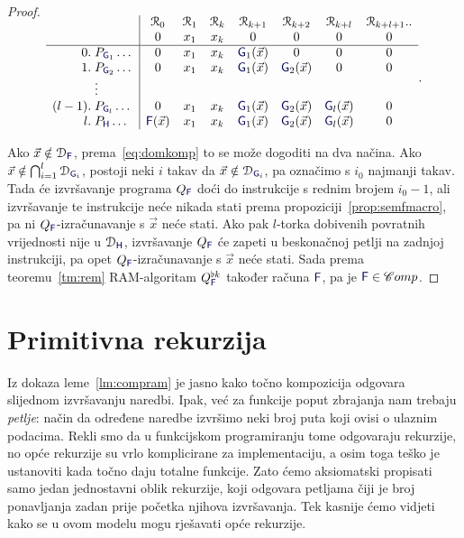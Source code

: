 \begin{proof}
\begin{equation}
\begin{array}{r@{\;}l|ccccccc}
\SwapAboveDisplaySkip
      &               &\reg0       &\reg1&\reg{k}&\reg{k+1}     &\reg{k+2}     &\reg{k+l}     &\reg{k+l+1}..\\
      &               & 0          &x_1  &x_k    &0             &0             &0             &0            \\\hline
0.    &P_{\f G_1}\dots& 0          &x_1  &x_k    &\f G_1(\vec x)&0             &0             &0            \\
1.    &P_{\f G_2}\dots& 0          &x_1  &x_k    &\f G_1(\vec x)&\f G_2(\vec x)&0             &0            \\
      &\vdots                                                                                               \\
(l-1).&P_{\f G_l}\dots& 0          &x_1  &x_k    &\f G_1(\vec x)&\f G_2(\vec x)&\f G_l(\vec x)&0            \\
l.    &P_{\f H}\dots  &\f F(\vec x)&x_1  &x_k    &\f G_1(\vec x)&\f G_2(\vec x)&\f G_l(\vec x)&0
    \end{array}\text.
\end{equation}
\smallskip

Ako $\vec x\notin\dom{\f F}$, prema~\eqref{eq:domkomp} to se može dogoditi na dva načina. Ako $\vec x\notin\bigcap_{i=1}^l\dom{\f G_i}$, postoji neki $i$ takav da $\vec x\notin\dom{\f G_i}$, pa označimo s $i_0$ najmanji takav\!. Tada će izvršavanje programa $Q_{\f F}$ doći do instrukcije s rednim brojem $i_0-1$, ali izvršavanje te instrukcije neće nikada stati prema propoziciji~\ref{prop:semfmacro}, pa ni $Q_{\f F}$-izračunavanje s $\vec x$ neće stati. Ako pak $l$-torka dobivenih povratnih vrijednosti nije u $\dom{\f H}$, izvršavanje $Q_{\f F}$ će zapeti u beskonačnoj petlji na zadnjoj instrukciji, pa opet $Q_{\f F}$-izračunavanje s $\vec x$ neće stati.
Sada prema teoremu~\ref{tm:rem} RAM-algoritam $Q_{\f F}^{\flat k}$ također računa $\f F$, pa je $\f F\in\mathscr Comp$.
\end{proof}

\section{Primitivna rekurzija}

Iz dokaza leme~\ref{lm:compram} je jasno kako točno kompozicija odgovara slijednom iz\-vrša\-va\-nju naredbi. Ipak, već za funkcije poput zbrajanja nam trebaju \emph{petlje}: način da određene naredbe izvršimo neki broj puta koji ovisi o ulaznim podacima. Rekli smo da u funkcijskom programiranju tome odgovaraju rekurzije, no opće rekurzije su vrlo komplicirane za implementaciju, a osim toga teško je ustanoviti kada točno daju totalne funkcije. Zato ćemo aksiomatski propisati samo jedan jednostavni oblik rekurzije, koji odgovara petljama čiji je broj ponavljanja zadan prije početka njihova izvršavanja. Tek kasnije ćemo vidjeti kako se u ovom modelu mogu rješavati opće rekurzije.%


